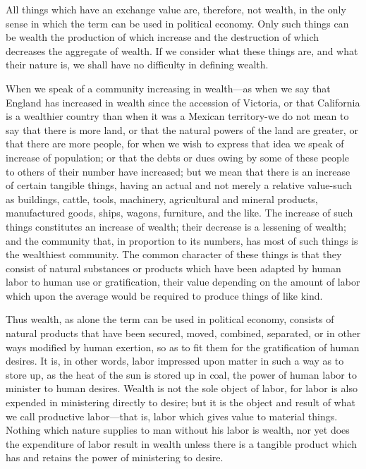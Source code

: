 All things which have an exchange value are, therefore, not wealth, in
the only sense in which the term can be used in political economy. Only
such things can be wealth the production of which increase and the
destruction of which decreases the aggregate of wealth. If we consider
what these things are, and what their nature is, we shall have no
difficulty in defining wealth.

When we speak of a community increasing in wealth---as when we say that
England has increased in wealth since the accession of Victoria, or that
California is a wealthier country than when it was a Mexican
territory-we do not mean to say that there is more land, or that the
natural powers of the land are greater, or that there are more people,
for when we wish to express that idea we speak of increase of
population; or that the debts or dues owing by some of these people to
others of their number have increased; but we mean that there is an
increase of certain tangible things, having an actual and not merely a
relative value-such as buildings, cattle, tools, machinery, agricultural
and mineral products, manufactured goods, ships, wagons, furniture, and
the like. The increase of such things constitutes an increase of wealth;
their decrease is a lessening of wealth; and the community that, in
proportion to its numbers, has most of such things is the wealthiest
community. The common character of these things is that they consist of
natural substances or products which have been adapted by human labor to
human use or gratification, their value depending on the amount of labor
which upon the average would be required to produce things of like kind.

Thus wealth, as alone the term can be used in political economy,
consists of natural products that have been secured, moved, combined,
separated, or in other ways modified by human exertion, so as to fit
them for the gratification of human desires. It is, in other words,
labor impressed upon matter in such a way as to store up, as the heat of
the sun is stored up in coal, the power of human labor to minister to
human desires. Wealth is not the sole object of labor, for labor is also
expended in ministering directly to desire; but it is the object and
result of what we call productive labor---that is, labor which gives
value to material things. Nothing which nature supplies to man without
his labor is wealth, nor yet does the expenditure of labor result in
wealth unless there is a tangible product which has and retains the
power of ministering to desire.

